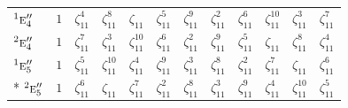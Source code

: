 \documentclass[10pt,a4paper]{article}
\numberwithin{equation}{section}
\newcommand{\irr}[1]{\text{\normalfont\scshape #1}}
\newcommand{\conjpair}[1]{{}^{#1}}
\newcommand{\rootunity}[1]{\zeta_{#1}}
\begin{document}
{\begin{longtable}{@{}lccccccccccc@{}}
$\conjpair{1}\irr{e}_{4}''$ & $1$ & $\rootunity{11}^{4}$ & $\rootunity{11}^{8}$ & $\rootunity{11}$ & $\rootunity{11}^{5}$ & $\rootunity{11}^{9}$ & $\rootunity{11}^{2}$ & $\rootunity{11}^{6}$ & $\rootunity{11}^{10}$ & $\rootunity{11}^{3}$ & $\rootunity{11}^{7}$\\
$\conjpair{2}\irr{e}_{4}''$ & $1$ & $\rootunity{11}^{7}$ & $\rootunity{11}^{3}$ & $\rootunity{11}^{10}$ & $\rootunity{11}^{6}$ & $\rootunity{11}^{2}$ & $\rootunity{11}^{9}$ & $\rootunity{11}^{5}$ & $\rootunity{11}$ & $\rootunity{11}^{8}$ & $\rootunity{11}^{4}$\\
$\conjpair{1}\irr{e}_{5}''$ & $1$ & $\rootunity{11}^{5}$ & $\rootunity{11}^{10}$ & $\rootunity{11}^{4}$ & $\rootunity{11}^{9}$ & $\rootunity{11}^{3}$ & $\rootunity{11}^{8}$ & $\rootunity{11}^{2}$ & $\rootunity{11}^{7}$ & $\rootunity{11}$ & $\rootunity{11}^{6}$\\*
$\conjpair{2}\irr{e}_{5}''$ & $1$ & $\rootunity{11}^{6}$ & $\rootunity{11}$ & $\rootunity{11}^{7}$ & $\rootunity{11}^{2}$ & $\rootunity{11}^{8}$ & $\rootunity{11}^{3}$ & $\rootunity{11}^{9}$ & $\rootunity{11}^{4}$ & $\rootunity{11}^{10}$ & $\rootunity{11}^{5}$\\
\bottomrule\end{longtable}}
\end{document}
